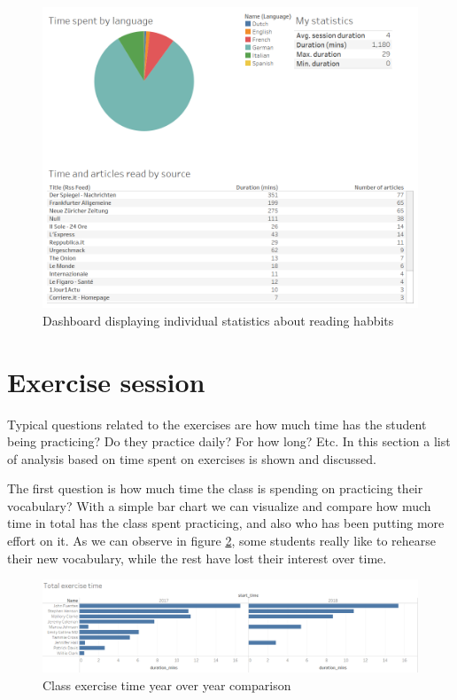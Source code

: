 \begin{figure}[!htb]
	\centering
	\includegraphics[width=0.7\linewidth]{gfx/Personal_dashboard}
	\caption{Dashboard displaying individual statistics about reading habbits}
	\label{fig:Personal_dashboard}
\end{figure}



\section{Exercise session}
Typical questions related to the exercises are how much time has the student being practicing? Do they practice daily? For how long? Etc. In this section a list of analysis based on time spent on exercises is shown and discussed.

The first question is how much time the class is spending on practicing their vocabulary? With a simple bar chart we can visualize and compare how much time in total has the class spent practicing, and also who has been putting more effort on it. As we can observe in figure \ref{fig:Total_exercise_time}, some students really like to rehearse their new vocabulary, while the rest have lost their interest over time.

\begin{figure}[bth]
	\centering
	\includegraphics[width=0.7\linewidth]{gfx/Total_exercise_time}
	\caption{Class exercise time year over year comparison}
	\label{fig:Total_exercise_time}
\end{figure}

